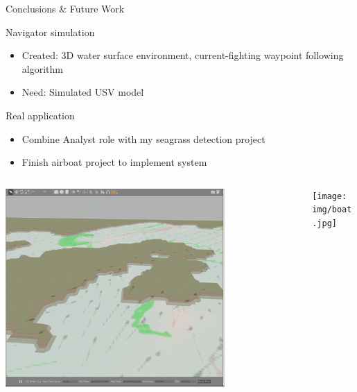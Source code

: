 \documentclass[9pt]{beamer}
\begin{document}
\begin{frame}{Conclusions \& Future Work}
    \begin{block}{Navigator simulation}
        \begin{itemize}
	        \item Created: 3D water surface environment, current-fighting waypoint following algorithm
	        \item Need: Simulated USV model
        \end{itemize}
    \end{block}
    \begin{block}{Real application}
        \begin{itemize}
	        \item Combine Analyst role with my seagrass detection project
	        \item Finish airboat project to implement system
        \end{itemize}
    \end{block}
    \begin{columns}
        \begin{column}{0.5\textwidth}
            \begin{center}
                \includegraphics[width=0.75\textwidth,trim={2cm 2cm 2.5cm 2.5cm},clip]{img/gazebosim2.png}
            \end{center}
        \end{column}
        \begin{column}{0.5\textwidth}
            \begin{center}
                \texttt{[image: img/boat.jpg]}
            \end{center}
        \end{column}
    \end{columns}
\end{frame}
\end{document}
